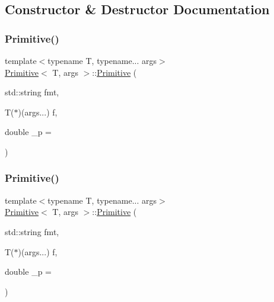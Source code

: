 \subsection{Constructor \& Destructor Documentation}
\mbox{\label{struct_primitive_a4303c3567a7bb2921d298f48b07b0add}} 
\subsubsection{\texorpdfstring{Primitive()}{Primitive()}\hspace{0.1cm}{\footnotesize\ttfamily [1/2]}}
{\footnotesize\ttfamily template$<$typename T, typename... args$>$ \\
\hyperlink{struct_primitive}{Primitive}$<$ T, args $>$\+::\hyperlink{struct_primitive}{Primitive} (\begin{DoxyParamCaption}\item[{std\+::string}]{fmt,  }\item[{T($\ast$)(args...)}]{f,  }\item[{double}]{\+\_\+p = {} }\end{DoxyParamCaption})\hspace{0.3cm}{\ttfamily [inline]}}

\mbox{\label{struct_primitive_a4303c3567a7bb2921d298f48b07b0add}} 
\subsubsection{\texorpdfstring{Primitive()}{Primitive()}\hspace{0.1cm}{\footnotesize\ttfamily [2/2]}}
{\footnotesize\ttfamily template$<$typename T, typename... args$>$ \\
\hyperlink{struct_primitive}{Primitive}$<$ T, args $>$\+::\hyperlink{struct_primitive}{Primitive} (\begin{DoxyParamCaption}\item[{std\+::string}]{fmt,  }\item[{T($\ast$)(args...)}]{f,  }\item[{double}]{\+\_\+p = {} }\end{DoxyParamCaption})\hspace{0.3cm}{\ttfamily [inline]}}



